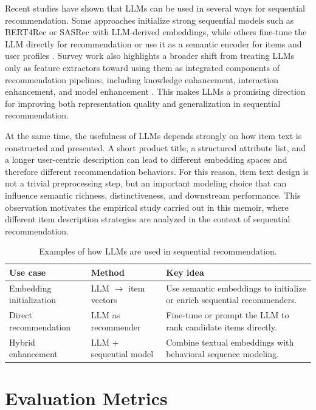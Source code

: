 \documentclass[12pt,a4paper]{report}
\begin{document}
Recent studies have shown that LLMs can be used in several ways for sequential
recommendation. Some approaches initialize strong sequential models such as
BERT4Rec or SASRec with LLM-derived embeddings, while others fine-tune the LLM
directly for recommendation or use it as a semantic encoder for items and user
profiles \citep{harte2023leveraging,llmrec2024,wu2023survey}. Survey work also
highlights a broader shift from treating LLMs only as feature extractors toward
using them as integrated components of recommendation pipelines, including
knowledge enhancement, interaction enhancement, and model enhancement
\citep{liu2024llmers}. This makes LLMs a promising direction for improving both
representation quality and generalization in sequential recommendation.

At the same time, the usefulness of LLMs depends strongly on how item text is
constructed and presented. A short product title, a structured attribute list,
and a longer user-centric description can lead to different embedding spaces and
therefore different recommendation behaviors. For this reason, item text
design is not a trivial preprocessing step, but an important modeling choice
that can influence semantic richness, distinctiveness, and downstream
performance. This observation motivates the empirical study carried out in this
memoir, where different item description strategies are analyzed in the context
of sequential recommendation.

\begin{table}[h]
\centering
\begin{tabular}{p{3cm} p{3.5cm} p{6.3cm}}
\toprule
\textbf{Use case} & \textbf{Method} & \textbf{Key idea} \\
\midrule
Embedding initialization & LLM $\rightarrow$ item vectors & Use semantic embeddings to initialize or enrich sequential recommenders. \\
Direct recommendation & LLM as recommender & Fine-tune or prompt the LLM to rank candidate items directly. \\
Hybrid enhancement & LLM + sequential model & Combine textual embeddings with behavioral sequence modeling. \\
\bottomrule
\end{tabular}

\caption{Examples of how LLMs are used in sequential recommendation.}
\label{tab:llm_seq}
\end{table}


\section{Evaluation Metrics}
\end{document}
